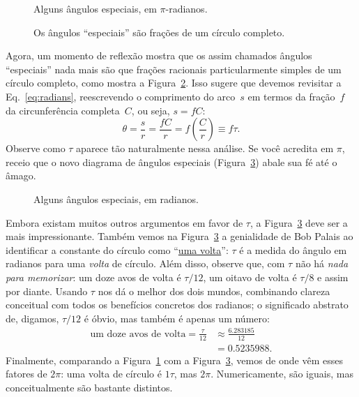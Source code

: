 {\begin{figure}
\begin{center}
\end{center}
\caption{Alguns ângulos especiais, em $\pi$-radianos.\label{fig:pi_angles}}
\end{figure}

\begin{figure}
\begin{center}
\end{center}
\caption{Os ângulos ``especiais'' são frações de um círculo completo.\label{fig:angle_fractions}}
\end{figure}

Agora, um momento de reflexão mostra que os assim chamados ângulos ``especiais'' nada mais são que frações racionais particularmente simples de um círculo completo, como mostra a Figura~\ref{fig:angle_fractions}. Isso sugere que devemos revisitar a Eq.~\eqref{eq:radians}, reescrevendo o comprimento do arco~$s$ em termos da fração~$f$ da circunferência completa~$C$, ou seja, $s = f C$:
\[ \theta = \frac{s}{r} = \frac{fC}{r} =  f\left(\frac{C}{r}\right) \equiv f\tau. \]
Observe como $\tau$ aparece tão naturalmente nessa análise. Se você acredita em $\pi$, receio que o novo diagrama de ângulos especiais (Figura~\ref{fig:tau_angles}) abale sua fé até o âmago.

\begin{figure}
\begin{center}
\end{center}
\caption{Alguns ângulos especiais, em radianos.\label{fig:tau_angles}}
\end{figure}

Embora existam muitos outros argumentos em favor de $\tau$, a Figura~\ref{fig:tau_angles} deve ser a mais impressionante. Também vemos na Figura~\ref{fig:tau_angles} a genialidade de Bob Palais ao identificar a constante do círculo como ``\href{https://pt.wikipedia.org/wiki/Volta_(geometria)}{uma volta}'': $\tau$ é a medida do ângulo em radianos para uma \emph{volta} de círculo. Além disso, observe que, com $\tau$ não há \emph{nada para memorizar}: um doze avos de volta é $\tau/12$, um oitavo de volta é $\tau/8$ e assim por diante. Usando $\tau$ nos dá o melhor dos dois mundos, combinando clareza conceitual com todos os benefícios concretos dos radianos; o significado abstrato de, digamos, $\tau/12$ é óbvio, mas também é apenas um número:
\[
\begin{split}
\mbox{um doze avos de volta} = \frac{\tau}{12} & \approx \frac{6.283185}{12} \\
                                             & = 0.5235988.
\end{split}
\]
Finalmente, comparando a Figura~\ref{fig:pi_angles} com a Figura~\ref{fig:tau_angles}, vemos de onde vêm esses fatores  de $2\pi$: uma volta de círculo é $1\tau$, mas $2\pi$. Numericamente, são iguais, mas conceitualmente são bastante distintos.

}
